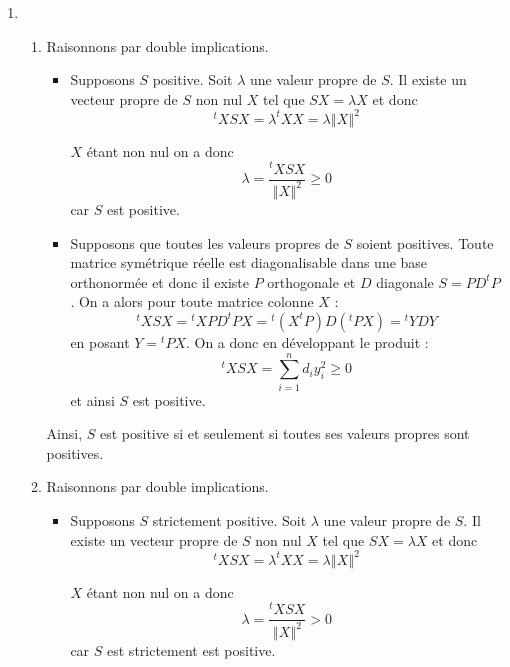 \documentclass[a4paper,10pt]{report}
\begin{document}
\begin{enumerate}
\item 
\begin{enumerate}
\item Raisonnons par double implications.

\begin{itemize}
\item Supposons $S$ positive. Soit $\lambda $ une valeur propre de $S$. Il existe un vecteur propre de $S$ non nul $X$ tel que $SX=\lambda X$ et donc 
\[
^{t}XSX=\lambda ^{t}XX=\lambda \left\Vert X\right\Vert ^{2}
\]

$X$ \'etant non nul on a donc 
\[
\lambda =\frac{^{t}XSX}{\left\Vert X\right\Vert ^{2}} \geq 0
\]
car $S$ est positive.

\item Supposons que toutes les valeurs propres de $S$ soient positives. Toute matrice sym\'etrique r\'eelle est diagonalisable dans une base orthonorm\'ee et donc il existe $P$ orthogonale et $D$ diagonale $S=PD^{t}P$. On a alors pour toute matrice colonne $X$ :
$$^{t}XSX={}^{t}XPD^{t}PX={}^{t}\left( X^{t}P\right) D(^{t}PX)={}^{t}YDY$$
en posant $Y={}^{t}PX$. On a donc en développant le produit :
$$^{t}XSX= \sum_{i=1}^{n}d_{i}y_{i}^{2} \geq 0$$
et ainsi $S$ est positive.
\end{itemize}
Ainsi, $S$ est positive si et seulement si toutes ses valeurs propres sont positives.
\item  Raisonnons par double implications.

\begin{itemize}
\item Supposons $S$ strictement positive. Soit $\lambda $ une valeur propre de $S$. Il existe un vecteur propre de $S$ non nul $X$ tel que $SX=\lambda X$ et donc 
\[
^{t}XSX=\lambda ^{t}XX=\lambda \left\Vert X\right\Vert ^{2}
\]

$X$ \'etant non nul on a donc 
\[
\lambda =\frac{^{t}XSX}{\left\Vert X\right\Vert ^{2}} > 0
\]
car $S$ est strictement est positive.


\end{itemize}
\end{enumerate}
\end{enumerate}
\end{document}
